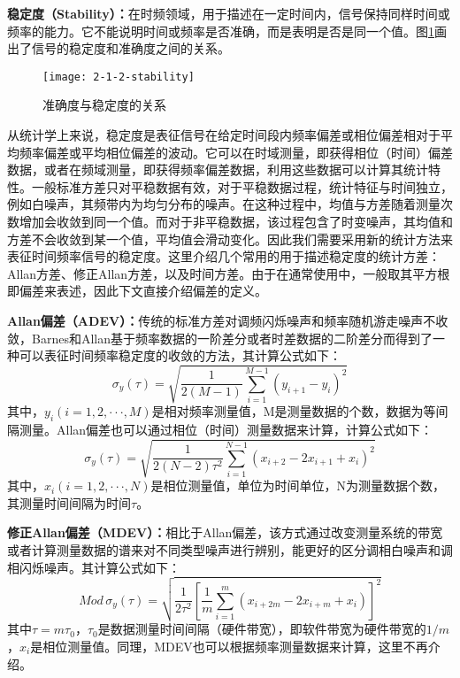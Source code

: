\textbf{稳定度（Stability）：}在时频领域，用于描述在一定时间内，信号保持同样时间或频率的能力。它不能说明时间或频率是否准确，而是表明是否是同一个值。图\ref{2-1-2-stability}画出了信号的稳定度和准确度之间的关系。
\begin{figure}[htbp]
\centering
\texttt{[image: 2-1-2-stability]}
\caption{准确度与稳定度的关系}
\label{2-1-2-stability}
\end{figure}

从统计学上来说，稳定度是表征信号在给定时间段内频率偏差或相位偏差相对于平均频率偏差或平均相位偏差的波动。它可以在时域测量，即获得相位（时间）偏差数据，或者在频域测量，即获得频率偏差数据，利用这些数据可以计算其统计特性。一般标准方差只对平稳数据有效，对于平稳数据过程，统计特征与时间独立，例如白噪声，其频带内为均匀分布的噪声。在这种过程中，均值与方差随着测量次数增加会收敛到同一个值。而对于非平稳数据，该过程包含了时变噪声，其均值和方差不会收敛到某一个值，平均值会滑动变化。因此我们需要采用新的统计方法来表征时间频率信号的稳定度。这里介绍几个常用的用于描述稳定度的统计方差：Allan方差、修正Allan方差，以及时间方差。由于在通常使用中，一般取其平方根即偏差来表述，因此下文直接介绍偏差的定义。

\textbf{Allan偏差（ADEV）：}传统的标准方差对调频闪烁噪声和频率随机游走噪声不收敛，Barnes和Allan基于频率数据的一阶差分或者时差数据的二阶差分而得到了一种可以表征时间频率稳定度的收敛的方法，其计算公式如下：
\begin{equation}
\sigma_{y}(\tau)=\sqrt{\dfrac{1}{2(M-1)}\sum_{i=1}^{M-1}(y_{i+1}-y_{i})^{2}}
\end{equation}
其中，$y_{i}(i=1,2,\cdot\cdot\cdot,M)$是相对频率测量值，M是测量数据的个数，数据为等间隔测量。Allan偏差也可以通过相位（时间）测量数据来计算，计算公式如下：
\begin{equation}
\sigma_{y}(\tau)=\sqrt{\dfrac{1}{2(N-2)\tau^{2}}\sum_{i=1}^{N-1}(x_{i+2}-2x_{i+1}+x_{i})^{2}}
\end{equation}
其中，$x_{i}(i=1,2,\cdot\cdot\cdot,N)$是相位测量值，单位为时间单位，N为测量数据个数，其测量时间间隔为时间$\tau$。

\textbf{修正Allan偏差（MDEV）：}相比于Allan偏差，该方式通过改变测量系统的带宽或者计算测量数据的谱来对不同类型噪声进行辨别，能更好的区分调相白噪声和调相闪烁噪声。其计算公式如下：
\begin{equation}
Mod\,\sigma_{y}(\tau)=\sqrt{\dfrac{1}{2\tau^{2}}[\dfrac{1}{m}\sum_{i=1}^{m}(x_{i+2m}-2x_{i+m}+x_{i})]^{2}}
\end{equation}
其中$\tau=m\tau_{0}$，$\tau_{0}$是数据测量时间间隔（硬件带宽），即软件带宽为硬件带宽的$1/m$，$x_{i}$是相位测量值。同理，MDEV也可以根据频率测量数据来计算，这里不再介绍。

